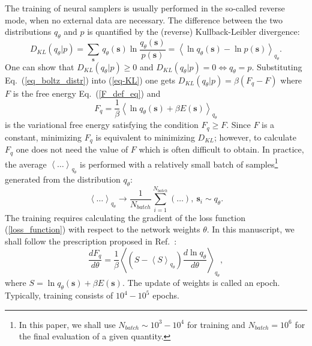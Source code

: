 \documentclass[3p, times,merge]{elsarticle}
\newcommand{\avg}[1]{\left\langle{#1}\right\rangle}
\begin{document}
The training of neural samplers is usually performed in the so-called reverse mode, when no external data are necessary. The difference between the two distributions $q_\theta$ and $p$ is quantified by the (reverse) Kullback-Leibler divergence:
\begin{equation}\label{eq-KL}
    D_{KL}(q_{\theta}|p) = \sum_{\mathbf{s}} \, q_{\theta}(\mathbf{s}) \ln \frac{q_{\theta}(\mathbf{s})}{p(\mathbf{s})} = \avg{\ln q_{\theta}(\mathbf{s})-\ln p(\mathbf{s})}_{q_{\theta}}.
\end{equation}
One can show that $D_{KL}(q_{\theta}|p)\ge0$ and $D_{KL}(q_{\theta}|p)=0 \Leftrightarrow q_{\theta}=p$. Substituting Eq.~(\ref{eq_boltz_distr}) into (\ref{eq-KL}) one gets $D_{KL}(q_{\theta}|p)=\beta(F_q-F)$ where $F$ is the free energy Eq.~(\ref{F_def_eq}) and
\begin{equation}
    F_q=\frac{1}{\beta}\avg{\ln q_{\theta}(\mathbf{s})+\beta  E(\mathbf{s}) }_{q_{\theta}}
    \label{loss_function}
\end{equation}
is the variational free energy satisfying the condition $F_q\ge F$. Since $F$ is a constant, minimizing $F_q$ is equivalent to minimizing $D_{KL}$; however, to calculate $F_q$ one does not need the value of $F$ which is often difficult to obtain. In practice, the average $\avg{\ldots }_{q_{\theta}}$ is performed with a relatively small batch of samples\footnote{In this paper, we shall use $N_{batch}\sim10^3-10^4$ for training and  $N_{batch}=10^6$ for the final evaluation of a given quantity.} generated from the distribution $q_{\theta}$:
\begin{equation}
    \avg{\ldots }_{q_{\theta}} \to \frac{1}{N_{batch}}\sum_{i=1}^{N_{batch}} (\ldots), \ \textbf{s}_{i}\sim q_\theta.
    \label{averaging_over_q}
\end{equation}
The training requires calculating the gradient of the loss function (\ref{loss_function}) with respect to the network weights $\theta$. In this manuscript, we shall follow the prescription proposed in Ref.~\cite{2019PhRvL.122h0602W}:
\begin{equation}
    \frac{d F_q}{d\theta}= \frac{1}{\beta}\avg{\left(S-\avg{S}_{q_{\theta}} \right) \frac{d \ln q_\theta}{d\theta} }_{q_{\theta}}, 
\end{equation}
where $S=\ln q_{\theta}(\mathbf{s})+\beta  E(\mathbf{s})$.
The update of weights is called an epoch. Typically, training consists of $10^4-10^5$ epochs.
\end{document}
